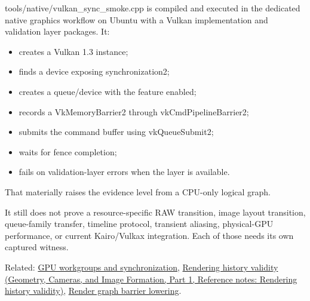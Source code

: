\hypertarget{appendix-f15ce0d9c170-native-witness-now-in-the-repository}{}

tools/native/vulkan\_sync\_smoke.cpp is compiled and executed in the dedicated native graphics workflow on Ubuntu with a Vulkan implementation and validation layer packages. It:

\begin{itemize}
\tightlist
\item
  creates a Vulkan 1.3 instance;
\item
  finds a device exposing synchronization2;
\item
  creates a queue/device with the feature enabled;
\item
  records a VkMemoryBarrier2 through vkCmdPipelineBarrier2;
\item
  submits the command buffer using vkQueueSubmit2;
\item
  waits for fence completion;
\item
  fails on validation-layer errors when the layer is available.
\end{itemize}

That materially raises the evidence level from a CPU-only logical graph.

It still does not prove a resource-specific RAW transition, image layout transition, queue-family transfer, timeline protocol, transient aliasing, physical-GPU performance, or current Kairo/Vulkax integration. Each of those needs its own captured witness.

Related: \hyperref[appendix-f662b5b1773b]{GPU workgroups and synchronization}, \href{../03-Geometry-Cameras-and-Image-Formation-P01/main.pdf\#appendix-2e7e9fd28a2c}{Rendering history validity (Geometry, Cameras, and Image Formation, Part 1, Reference notes: Rendering history validity)}, \hyperref[appendix-0fc95374cb7e]{Render graph barrier lowering}.
